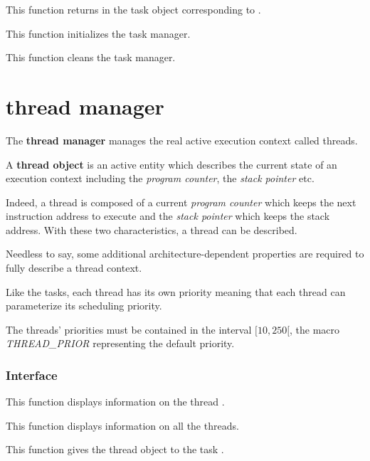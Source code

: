 	 {
	   This function returns in  the task object corresponding
	   to .
	 }

	 {
	   This function initializes the task manager.
	 }

	 {
	   This function cleans the task manager.
	 }

%
%

\section{thread manager}

The \textbf{thread manager} manages the real active execution context
called threads.

A \textbf{thread object} is an active entity which describes the
current state of an execution context including the \textit{program counter},
the \textit{stack pointer} etc.

Indeed, a thread is composed of a current \textit{program counter} which
keeps the next instruction address to execute and the \textit{stack pointer}
which keeps the stack address. With these two characteristics, a thread
can be described.

Needless to say, some additional architecture-dependent properties are
required to fully describe a thread context.

Like the tasks, each thread has its own priority meaning that each thread
can parameterize its scheduling priority.

The threads' priorities must be contained in the interval $[10, 250[$, the
macro \textit{THREAD\_PRIOR} representing the default priority.

%
%

\subsubsection{Interface}

	 {
	   This function displays information on the thread .
	 }

	 {
	   This function displays information on all the threads.
	 }

	 {
	   This function gives the thread object  to the
	   task .
	 }

